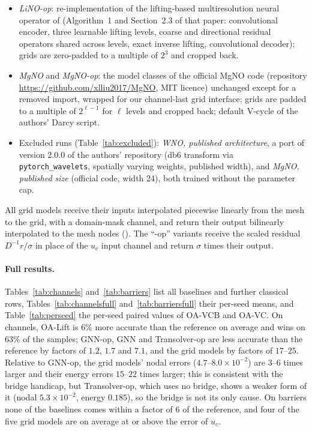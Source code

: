 \begin{itemize}
use the \texttt{pytorch\_wavelets} backend, the barrier rows a fallback implementation of the same periodised db4 transform.
\item \emph{LiNO-op}: re-implementation of the lifting-based multiresolution neural operator of \cite{pandey2026lino}
(Algorithm~1 and Section~2.3 of that paper: convolutional encoder, three learnable lifting levels, coarse and directional
residual operators shared across levels, exact inverse lifting, convolutional decoder); grids are zero-padded to a multiple of
$2^3$ and cropped back.
\item \emph{MgNO} and \emph{MgNO-op}: the model classes of the official MgNO code \cite{he2024mgno} (repository
\url{https://github.com/xlliu2017/MgNO}, MIT licence) unchanged except for a removed import, wrapped for our channel-last grid
interface; grids are padded to a multiple of $2^{\ell-1}$ for $\ell$ levels and cropped back; default V-cycle of the authors'
Darcy script.
\item Excluded runs (Table~\ref{tab:excluded}): \emph{WNO, published architecture}, a port of version 2.0.0 of the authors'
repository (db6 transform via \texttt{pytorch\_wavelets}, spatially varying weights, published width), and \emph{MgNO,
published size} (official code, width 24), both trained without the parameter cap.
\end{itemize}
All grid models receive their inputs interpolated piecewise linearly from the mesh to the grid, with a domain-mask channel,
and return their output bilinearly interpolated to the mesh nodes (). The ``-op'' variants receive the
scaled residual $D^{-1}r/\sigma$ in place of the $u_c$ input channel and return $\sigma$ times their output.

\paragraph{Full results.} Tables~\ref{tab:channels} and~\ref{tab:barriers} list all baselines and further classical rows,
Tables~\ref{tab:channelsfull} and~\ref{tab:barriersfull} their per-seed means, and Table~\ref{tab:perseed} the per-seed paired
values of OA-VCB and OA-VC. On channels, OA-Lift is $6\%$ more accurate than the reference on average and wins on $63\%$ of the
samples; GNN-op, GNN and Transolver-op are less accurate than the reference by factors of $1.2$, $1.7$ and $7.1$, and the grid
models by factors of $17$--$25$. Relative to GNN-op, the grid models' nodal errors ($4.7$--$8.0\times10^{-2}$) are $3$--$6$ times
larger and their energy errors $15$--$22$ times larger; this is consistent with the bridge handicap, but Transolver-op, which
uses no bridge, shows a weaker form of it (nodal $5.3\times10^{-2}$, energy $0.185$), so the bridge is not its only cause. On
barriers none of the baselines comes within a factor of $6$ of the reference, and four of the five grid models are on average at
or above the error of $u_c$.






